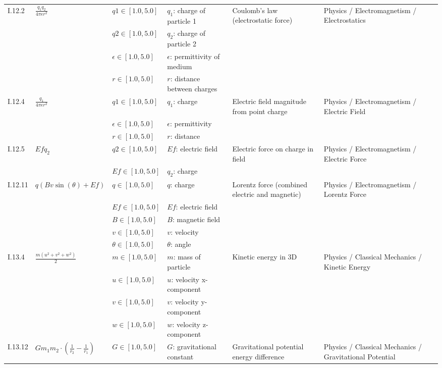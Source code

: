 \begin{longtable}{llllp{4cm}p{4cm}p{4cm}}
\hline
I.12.2 & $\frac{q_{1} q_{2}}{4 \pi \epsilon r^{2}}$ & $\mathit{q1} \in [1.0,5.0]$ & $q_1$: charge of particle 1 & Coulomb's law (electrostatic force) & Physics / Electromagnetism / Electrostatics & \\
 &  & $\mathit{q2} \in [1.0,5.0]$ & $q_2$: charge of particle 2 &  &  & \\
 &  & $\epsilon \in [1.0,5.0]$ & $\epsilon$: permittivity of medium &  &  & \\
 &  & $\mathit{r} \in [1.0,5.0]$ & $r$: distance between charges &  &  & \\
\hline
I.12.4 & $\frac{q_{1}}{4 \pi \epsilon r^{2}}$ & $\mathit{q1} \in [1.0,5.0]$ & $q_1$: charge & Electric field magnitude from point charge & Physics / Electromagnetism / Electric Field & \\
 &  & $\epsilon \in [1.0,5.0]$ & $\epsilon$: permittivity &  &  & \\
 &  & $\mathit{r} \in [1.0,5.0]$ & $r$: distance &  &  & \\
\hline
I.12.5 & $Ef q_{2}$ & $\mathit{q2} \in [1.0,5.0]$ & $Ef$: electric field & Electric force on charge in field & Physics / Electromagnetism / Electric Force & \\
 &  & $\mathit{Ef} \in [1.0,5.0]$ & $q_2$: charge &  &  & \\
\hline
I.12.11 & $q \left(B v \sin{\left(\theta \right)} + Ef\right)$ & $\mathit{q} \in [1.0,5.0]$ & $q$: charge & Lorentz force (combined electric and magnetic) & Physics / Electromagnetism / Lorentz Force & \\
 &  & $\mathit{Ef} \in [1.0,5.0]$ & $Ef$: electric field &  &  & \\
 &  & $\mathit{B} \in [1.0,5.0]$ & $B$: magnetic field &  &  & \\
 &  & $\mathit{v} \in [1.0,5.0]$ & $v$: velocity &  &  & \\
 &  & $\theta \in [1.0,5.0]$ & $\theta$: angle &  &  & \\
\hline
I.13.4 & $\frac{m \left(u^{2} + v^{2} + w^{2}\right)}{2}$ & $\mathit{m} \in [1.0,5.0]$ & $m$: mass of particle & Kinetic energy in 3D & Physics / Classical Mechanics / Kinetic Energy & \\
 &  & $\mathit{u} \in [1.0,5.0]$ & $u$: velocity x-component &  &  & \\
 &  & $\mathit{v} \in [1.0,5.0]$ & $v$: velocity y-component &  &  & \\
 &  & $\mathit{w} \in [1.0,5.0]$ & $w$: velocity z-component &  &  & \\
\hline
I.13.12 & $G m_{1} m_{2} \cdot \left(\frac{1}{r_{2}} - \frac{1}{r_{1}}\right)$ & $\mathit{G} \in [1.0,5.0]$ & $G$: gravitational constant & Gravitational potential energy difference & Physics / Classical Mechanics / Gravitational Potential & \\

\end{longtable}
